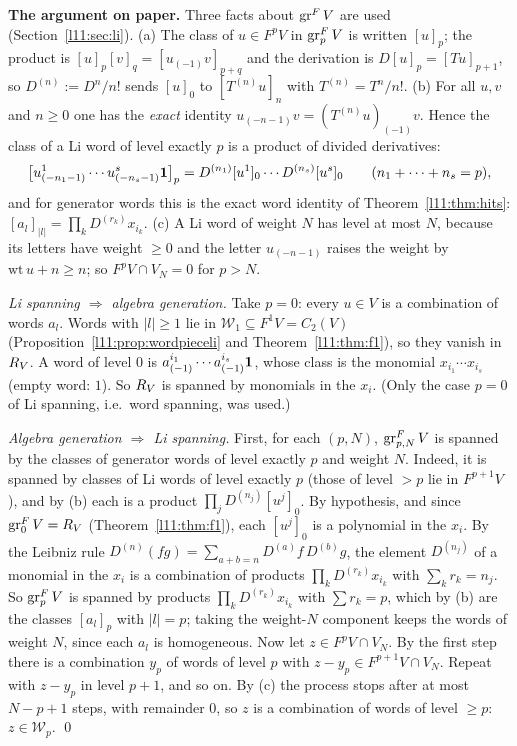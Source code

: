 \textbf{The argument on paper.} Three facts about $\operatorname{gr}^FV$ are used (Section~\ref{l11:sec:li}).
(a) The class of $u\in F^pV$ in $\operatorname{gr}^F_pV$ is written $[u]_p$; the product is
$[u]_p[v]_q = [u_{(-1)}v]_{p+q}$ and the derivation is $D[u]_p = [Tu]_{p+1}$, so $D^{(n)} := D^n/n!$ sends $[u]_0$ to
$[T^{(n)}u]_n$ with $T^{(n)} = T^n/n!$. (b) For all $u,v$ and $n\ge0$ one has the \emph{exact} identity
$u_{(-n-1)}v = (T^{(n)}u)_{(-1)}v$. Hence the class of a Li word of level exactly $p$ is a product of divided derivatives:
\begin{equation*}
  \bigl[u^1_{(-n_1-1)}\cdots u^s_{(-n_s-1)}\mathbf{1}\bigr]_p = D^{(n_1)}[u^1]_0\cdots D^{(n_s)}[u^s]_0
  \qquad(n_1+\dots+n_s = p),
\end{equation*}
and for generator words this is the exact word identity of Theorem~\ref{l11:thm:hits}:
$[a_l]_{|l|} = \prod_kD^{(r_k)}x_{i_k}$. (c) A Li word of weight $N$ has level at most $N$, because its letters have
weight $\ge0$ and the letter $u_{(-n-1)}$ raises the weight by $\mathrm{wt}\,u+n\ge n$; so $F^pV\cap V_N = 0$ for $p>N$.

\emph{Li spanning $\Rightarrow$ algebra generation.} Take $p=0$: every $u\in V$ is a combination of words $a_l$. Words with
$|l|\ge1$ lie in $\mathcal W_1\subseteq F^1V = C_2(V)$ (Proposition~\ref{l11:prop:wordpieceli} and
Theorem~\ref{l11:thm:f1}), so they vanish in $R_V$. A word of level $0$ is
$a^{i_1}_{(-1)}\cdots a^{i_s}_{(-1)}\mathbf{1}$, whose class is the monomial $x_{i_1}\cdots x_{i_s}$ (empty word: $1$). So
$R_V$ is spanned by monomials in the $x_i$. (Only the case $p=0$ of Li spanning, i.e.\ word spanning, was used.)

\emph{Algebra generation $\Rightarrow$ Li spanning.} First, for each $(p,N)$, $\operatorname{gr}^F_{p,N}V$ is spanned by the
classes of generator words of level exactly $p$ and weight $N$. Indeed, it is spanned by classes of Li words of level
exactly $p$ (those of level $>p$ lie in $F^{p+1}V$), and by (b) each is a product $\prod_jD^{(n_j)}[u^j]_0$. By hypothesis,
and since $\operatorname{gr}^F_0V = R_V$ (Theorem~\ref{l11:thm:f1}), each $[u^j]_0$ is a polynomial in the $x_i$. By the Leibniz rule $D^{(n)}(fg) = \sum_{a+b=n}D^{(a)}f\,D^{(b)}g$, the element
$D^{(n_j)}$ of a monomial in the $x_i$ is a combination of products $\prod_kD^{(r_k)}x_{i_k}$ with $\sum_kr_k = n_j$. So
$\operatorname{gr}^F_pV$ is spanned by products $\prod_kD^{(r_k)}x_{i_k}$ with $\sum r_k = p$, which by (b) are the classes
$[a_l]_p$ with $|l| = p$; taking the weight-$N$ component keeps the words of weight $N$, since each $a_l$ is
homogeneous. Now let $z\in F^pV\cap V_N$. By the first step there is a combination $y_p$ of words of level $p$ with
$z-y_p\in F^{p+1}V\cap V_N$. Repeat with $z-y_p$ in level $p+1$, and so on. By (c) the process stops after at most $N-p+1$
steps, with remainder $0$, so $z$ is a combination of words of level $\ge p$: $z\in\mathcal W_p$. \qed

